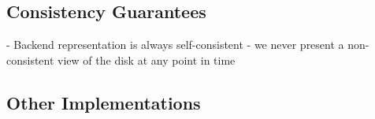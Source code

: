 \subsection{Consistency Guarantees}

- Backend representation is always self-consistent - we never present a non-consistent
view of the disk at any point in time

\subsection{Other Implementations}


